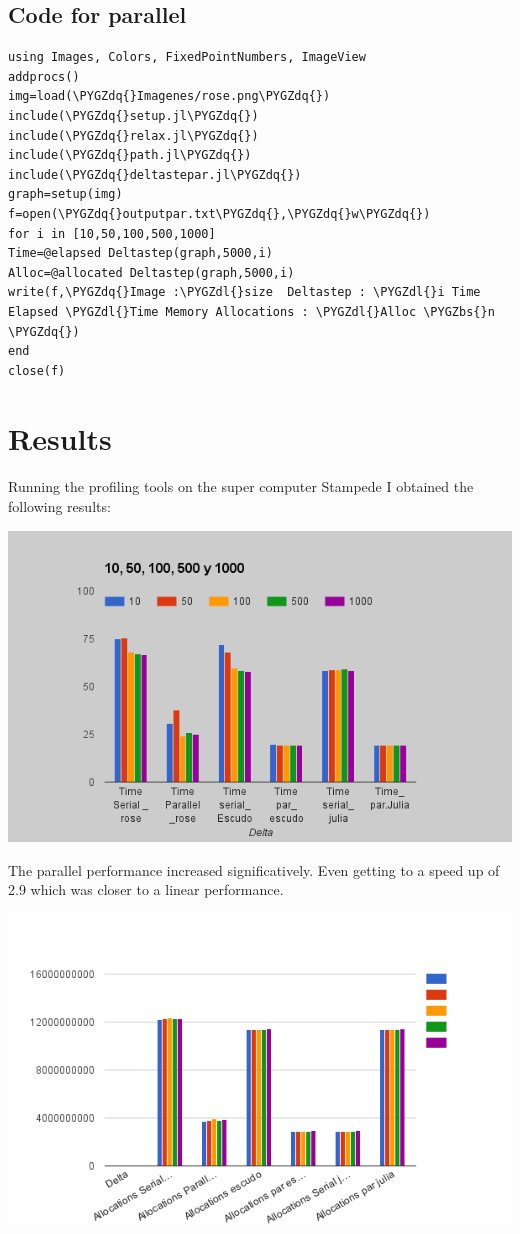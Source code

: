 \documentclass[letterpaper,10pt,english]{sphinxmanual}
\def\PYGZbs{\char`\\}
\def\PYGZdl{\char`\$}
\def\PYGZdq{\char`\"}
\begin{document}
\section{Code for parallel}
\label{profiling:code-for-parallel}
\begin{Verbatim}[commandchars=\\\{\}]
using Images, Colors, FixedPointNumbers, ImageView
addprocs()
img=load(\PYGZdq{}Imagenes/rose.png\PYGZdq{})
include(\PYGZdq{}setup.jl\PYGZdq{})
include(\PYGZdq{}relax.jl\PYGZdq{})
include(\PYGZdq{}path.jl\PYGZdq{})
include(\PYGZdq{}deltastepar.jl\PYGZdq{})
graph=setup(img)
f=open(\PYGZdq{}outputpar.txt\PYGZdq{},\PYGZdq{}w\PYGZdq{})
for i in [10,50,100,500,1000]
Time=@elapsed Deltastep(graph,5000,i)
Alloc=@allocated Deltastep(graph,5000,i)
write(f,\PYGZdq{}Image :\PYGZdl{}size  Deltastep : \PYGZdl{}i Time Elapsed \PYGZdl{}Time Memory Allocations : \PYGZdl{}Alloc \PYGZbs{}n \PYGZdq{})
end
close(f)
\end{Verbatim}


\chapter{Results}
\label{profiling:results}
Running the profiling tools on the super computer Stampede I obtained the following results:

\includegraphics{experiment.png}

The parallel performance increased significatively. Even getting to a speed up of 2.9 which was closer to a linear performance.

\includegraphics{allocations.png}
\end{document}
